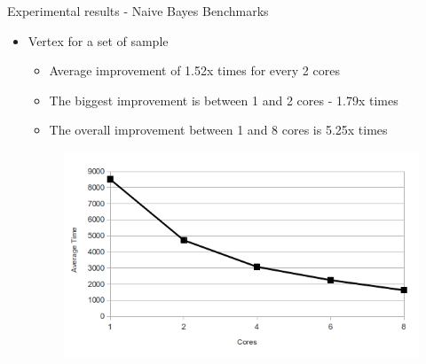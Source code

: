 \documentclass{beamer}
\begin{document}
\begin{frame}{Experimental results - Naive Bayes Benchmarks}

\begin{itemize}

\item{Vertex for a set of sample}

\begin{itemize}
\item Average improvement of 1.52x times for every 2 cores
\item The biggest improvement is between 1 and 2 cores - 1.79x times
\item The overall improvement between 1 and 8 cores is 5.25x times
\end{itemize}

\begin{figure}[!htb]
  \centering
  \includegraphics[scale=0.35]{naivebayes_plot.png}
  \label{fig:naive_plot}
\end{figure}

\end{itemize}

\end{frame}

\end{document}

